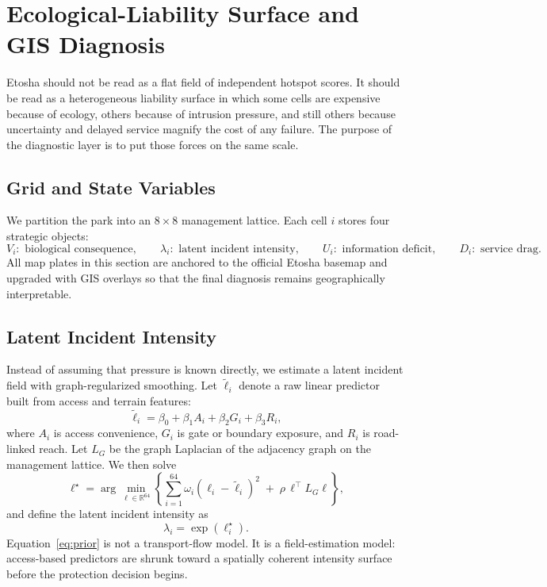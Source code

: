 \section{Ecological-Liability Surface and GIS Diagnosis}
Etosha should not be read as a flat field of independent hotspot scores. It should be read as a heterogeneous liability surface in which some cells are expensive because of ecology, others because of intrusion pressure, and still others because uncertainty and delayed service magnify the cost of any failure. The purpose of the diagnostic layer is to put those forces on the same scale.

\subsection{Grid and State Variables}
We partition the park into an \(8\times 8\) management lattice. Each cell \(i\) stores four strategic objects:
\[
V_i:\text{ biological consequence},\qquad
\lambda_i:\text{ latent incident intensity},\qquad
U_i:\text{ information deficit},\qquad
D_i:\text{ service drag}.
\]
All map plates in this section are anchored to the official Etosha basemap and upgraded with GIS overlays so that the final diagnosis remains geographically interpretable.

\subsection{Latent Incident Intensity}
Instead of assuming that pressure is known directly, we estimate a latent incident field with graph-regularized smoothing. Let \(\widetilde \ell_i\) denote a raw linear predictor built from access and terrain features:
\begin{equation}
\widetilde \ell_i = \beta_0+\beta_1A_i+\beta_2G_i+\beta_3R_i,
\label{eq:rawfield}
\end{equation}
where \(A_i\) is access convenience, \(G_i\) is gate or boundary exposure, and \(R_i\) is road-linked reach. Let \(L_G\) be the graph Laplacian of the adjacency graph on the management lattice. We then solve
\begin{equation}
\ell^\star
=
\arg\min_{\ell\in\mathbb{R}^{64}}
\left\{
\sum_{i=1}^{64}\omega_i(\ell_i-\widetilde \ell_i)^2
\;+\;
\rho\,\ell^\top L_G \ell
\right\},
\label{eq:prior}
\end{equation}
and define the latent incident intensity as
\begin{equation}
\lambda_i = \exp(\ell_i^\star).
\label{eq:intensity}
\end{equation}
Equation~\eqref{eq:prior} is not a transport-flow model. It is a field-estimation model: access-based predictors are shrunk toward a spatially coherent intensity surface before the protection decision begins.

